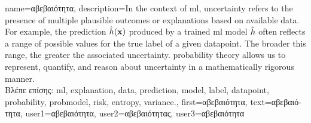 
{name={\foreignlanguage{greek}{αβεβαιότητα}},
	description={In the context of \gls{ml}, uncertainty refers to the presence 
		of multiple plausible outcomes or \gls{explanation}s based on available \gls{data}. For example, the 
		\gls{prediction} $\hat{h}({\bf x})$ produced by a trained \gls{ml} \gls{model} $\hat{h}$
	 	often reflects a range of possible values for the true \gls{label} of a given \gls{datapoint}. 
	 	The broader this range, the greater the associated uncertainty. \Gls{probability} theory 
	 	allows us to represent, quantify, and reason about uncertainty in a mathematically rigorous manner. \\
		\foreignlanguage{greek}{Βλέπε επίσης:} \gls{ml}, \gls{explanation}, \gls{data}, \gls{prediction}, \gls{model}, \gls{label}, 
		\gls{datapoint}, \gls{probability}, \gls{probmodel}, \gls{risk}, \gls{entropy}, \gls{variance}.},
	first={\foreignlanguage{greek}{αβεβαιότητα}},
	text={\foreignlanguage{greek}{αβεβαιότητα}},
	user1={\foreignlanguage{greek}{αβεβαιότητα}}, %
  	user2={\foreignlanguage{greek}{αβεβαιότητας}}, %
	user3={\foreignlanguage{greek}{αβεβαιότητα}} %
}

